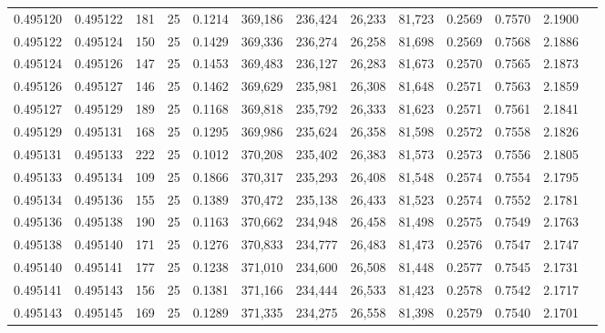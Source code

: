 \begin{tabular}{rrrrrrrrrrrrr}
0.495120 & 0.495122 &   181 &  25 &                                     0.1214 & 369,186 & 236,424 &  26,233 &  81,723 & 0.2569 & 0.7570 & 2.1900 \\
0.495122 & 0.495124 &   150 &  25 &                                     0.1429 & 369,336 & 236,274 &  26,258 &  81,698 & 0.2569 & 0.7568 & 2.1886 \\
0.495124 & 0.495126 &   147 &  25 &                                     0.1453 & 369,483 & 236,127 &  26,283 &  81,673 & 0.2570 & 0.7565 & 2.1873 \\
0.495126 & 0.495127 &   146 &  25 &                                     0.1462 & 369,629 & 235,981 &  26,308 &  81,648 & 0.2571 & 0.7563 & 2.1859 \\
0.495127 & 0.495129 &   189 &  25 &                                     0.1168 & 369,818 & 235,792 &  26,333 &  81,623 & 0.2571 & 0.7561 & 2.1841 \\
0.495129 & 0.495131 &   168 &  25 &                                     0.1295 & 369,986 & 235,624 &  26,358 &  81,598 & 0.2572 & 0.7558 & 2.1826 \\
0.495131 & 0.495133 &   222 &  25 &                                     0.1012 & 370,208 & 235,402 &  26,383 &  81,573 & 0.2573 & 0.7556 & 2.1805 \\
0.495133 & 0.495134 &   109 &  25 &                                     0.1866 & 370,317 & 235,293 &  26,408 &  81,548 & 0.2574 & 0.7554 & 2.1795 \\
0.495134 & 0.495136 &   155 &  25 &                                     0.1389 & 370,472 & 235,138 &  26,433 &  81,523 & 0.2574 & 0.7552 & 2.1781 \\
0.495136 & 0.495138 &   190 &  25 &                                     0.1163 & 370,662 & 234,948 &  26,458 &  81,498 & 0.2575 & 0.7549 & 2.1763 \\
0.495138 & 0.495140 &   171 &  25 &                                     0.1276 & 370,833 & 234,777 &  26,483 &  81,473 & 0.2576 & 0.7547 & 2.1747 \\
0.495140 & 0.495141 &   177 &  25 &                                     0.1238 & 371,010 & 234,600 &  26,508 &  81,448 & 0.2577 & 0.7545 & 2.1731 \\
0.495141 & 0.495143 &   156 &  25 &                                     0.1381 & 371,166 & 234,444 &  26,533 &  81,423 & 0.2578 & 0.7542 & 2.1717 \\
0.495143 & 0.495145 &   169 &  25 &                                     0.1289 & 371,335 & 234,275 &  26,558 &  81,398 & 0.2579 & 0.7540 & 2.1701 \\

\end{tabular}
